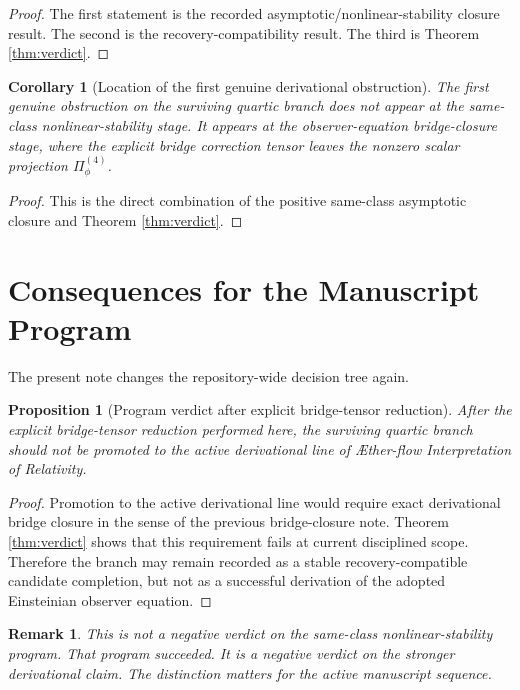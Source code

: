 \documentclass[11pt]{article}
\newcommand{\Aflow}{\AE{}ther-flow}
\newcommand{\TheoryName}{\Aflow{} Interpretation of Relativity}
\newtheorem{proposition}{Proposition}
\newtheorem{remark}{Remark}
\newtheorem{corollary}{Corollary}
\begin{document}
\begin{proof}
The first statement is the recorded asymptotic/nonlinear-stability closure result. The second is the recovery-compatibility result. The third is Theorem \ref{thm:verdict}.
\end{proof}

\begin{corollary}[Location of the first genuine derivational obstruction]
\label{cor:firstobstruction}
The first genuine obstruction on the surviving quartic branch does not appear at the same-class nonlinear-stability stage. It appears at the observer-equation bridge-closure stage, where the explicit bridge correction tensor leaves the nonzero scalar projection \(\Pi_\phi^{(4)}\).
\end{corollary}

\begin{proof}
This is the direct combination of the positive same-class asymptotic closure and Theorem \ref{thm:verdict}.
\end{proof}

\section{Consequences for the Manuscript Program}

The present note changes the repository-wide decision tree again.

\begin{proposition}[Program verdict after explicit bridge-tensor reduction]
\label{prop:program}
After the explicit bridge-tensor reduction performed here, the surviving quartic branch should not be promoted to the active derivational line of \TheoryName{}.
\end{proposition}

\begin{proof}
Promotion to the active derivational line would require exact derivational bridge closure in the sense of the previous bridge-closure note. Theorem \ref{thm:verdict} shows that this requirement fails at current disciplined scope. Therefore the branch may remain recorded as a stable recovery-compatible candidate completion, but not as a successful derivation of the adopted Einsteinian observer equation.
\end{proof}

\begin{remark}
This is not a negative verdict on the same-class nonlinear-stability program. That program succeeded. It is a negative verdict on the stronger derivational claim. The distinction matters for the active manuscript sequence.
\end{remark}
\end{document}
